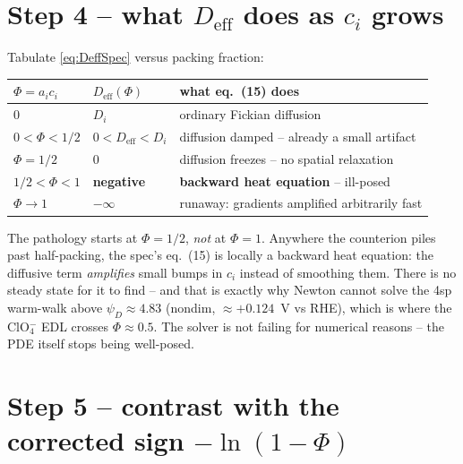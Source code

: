 \documentclass[11pt]{article}
\newcommand{\Deff}{D_{\mathrm{eff}}}
\begin{document}
\section{Step 4 -- what $\Deff$ does as $c_i$ grows}

Tabulate \eqref{eq:DeffSpec} versus packing fraction:

\begin{center}
\begin{tabular}{@{}lll@{}}
\toprule
$\Phi = a_i c_i$ & $\Deff(\Phi)$ & what eq.~(15) does \\
\midrule
$0$                  & $D_i$               & ordinary Fickian diffusion \\
$0 < \Phi < 1/2$     & $0 < \Deff < D_i$   & diffusion damped -- already a small artifact \\
$\Phi = 1/2$         & $0$                 & diffusion freezes -- no spatial relaxation \\
$1/2 < \Phi < 1$     & \textbf{negative}   & \textbf{backward heat equation} -- ill-posed \\
$\Phi \to 1$         & $-\infty$           & runaway: gradients amplified arbitrarily fast \\
\bottomrule
\end{tabular}
\end{center}

The pathology starts at $\Phi = 1/2$, \emph{not} at $\Phi = 1$. Anywhere
the counterion piles past half-packing, the spec's eq.~(15) is locally
a backward heat equation: the diffusive term \emph{amplifies} small
bumps in $c_i$ instead of smoothing them. There is no steady state for
it to find -- and that is exactly why Newton cannot solve the 4sp
warm-walk above $\psi_D \approx 4.83$ (nondim, $\approx +0.124$~V vs
RHE), which is where the ClO$_4^{-}$ EDL crosses $\Phi \approx 0.5$.
The solver is not failing for numerical reasons -- the PDE itself stops
being well-posed.

\section{Step 5 -- contrast with the corrected sign $-\ln(1-\Phi)$}
\end{document}
